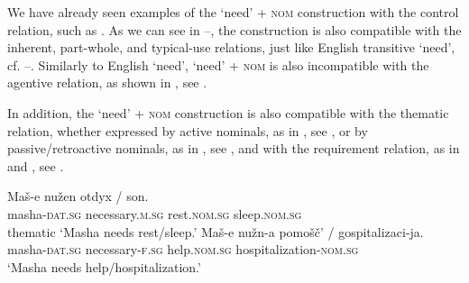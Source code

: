 \documentclass[output=paper,colorlinks,citecolor=brown]{langscibook}
\begin{document}
We have already seen examples of the `need' + \textsc{nom} construction with the control relation, such as . As we can see in --, the construction is also compatible with the inherent, part-whole, and typical-use relations, just like English transitive `need', cf. --. Similarly to English `need', `need' + \textsc{nom} is also incompatible with the agentive relation, as shown in , see .

\ea \label{nuzhen-R}
\z\z

\noindent In addition, the `need' + \textsc{nom} construction is also compatible with the thematic relation, whether expressed by active nominals, as in , see , or by passive/retroactive nominals, as in , see , and with the requirement relation, as in  and , see .

\ea
\ea \label{nuzhen-active}\gll Maš-e nužen otdyx / son.\\
masha-\textsc{dat.sg} necessary.\textsc{m.sg} rest.\textsc{nom.sg} {} sleep.\textsc{nom.sg}\\ \hfill thematic
\glt `Masha needs rest/sleep.'
\ex \label{nuzhen-passive}\gll Maš-e nužn-a pomošč' / gospitalizaci-ja.\\
masha-\textsc{dat.sg} necessary-\textsc{f.sg} help.\textsc{nom.sg} {}  hospitalization-\textsc{nom.sg}\\
\glt `Masha needs help/hospitalization.'
\z\z
\end{document}
